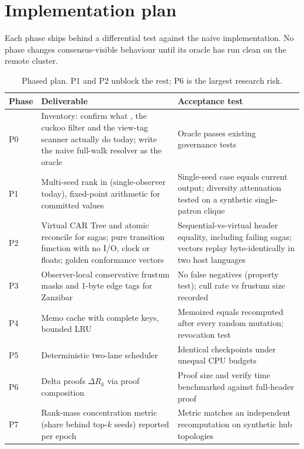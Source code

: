 \documentclass[a4paper,11pt,twoside,parskip=half-,headings=small]{scrartcl}
\begin{document}
\section{Implementation plan}
\label{sec:plan}

Each phase ships behind a differential test against the naive implementation. No phase changes consensus-visible behaviour until its oracle has run clean on the remote cluster.

\begin{table}[H]
\centering\small
\begin{tabularx}{\textwidth}{@{}L{1.5cm}YL{4.6cm}@{}}
\toprule
\textbf{Phase} & \textbf{Deliverable} & \textbf{Acceptance test} \\
\midrule
P0 & Inventory: confirm what , the cuckoo filter and the view-tag scanner actually do today; write the naive full-walk resolver as the oracle & Oracle passes existing governance tests \\
P1 & Multi-seed rank in  (single-observer today), fixed-point arithmetic for committed values & Single-seed case equals current output; diversity attenuation tested on a synthetic single-patron clique \\
P2 & Virtual CAR Tree and atomic reconcile for sagas; pure transition function with no I/O, clock or floats; golden conformance vectors & Sequential-vs-virtual header equality, including failing sagas; vectors replay byte-identically in two host languages \\
P3 & Observer-local conservative frustum masks and 1-byte edge tags for Zanzibar & No false negatives (property test); cull rate vs frustum size recorded \\
P4 & Memo cache with complete keys, bounded LRU & Memoized equals recomputed after every random mutation; revocation test \\
P5 & Deterministic two-lane scheduler & Identical checkpoints under unequal CPU budgets \\
P6 & Delta proofs $\Delta R_k$ via proof composition & Proof size and verify time benchmarked against full-header proof \\
P7 & Rank-mass concentration metric (share behind top-$k$ seeds) reported per epoch & Metric matches an independent recomputation on synthetic hub topologies \\
\bottomrule
\end{tabularx}
\caption{Phased plan. P1 and P2 unblock the rest; P6 is the largest research risk.}
\end{table}
\end{document}
